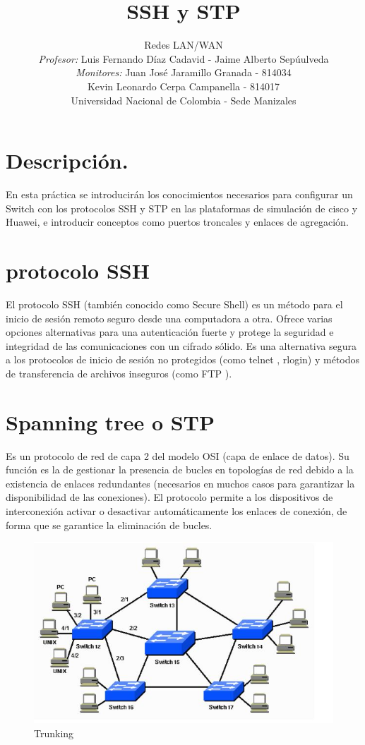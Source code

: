 \documentclass[journal]{IEEEtran}
\title{\textbf{SSH y STP}}
\author{Redes LAN/WAN \\
	\textit{Profesor:} Luis Fernando Díaz Cadavid - Jaime Alberto Sepúulveda\\
	\textit{Monitores:} Juan José Jaramillo Granada - 814034 \\
	Kevin Leonardo Cerpa Campanella - 814017 \\
	Universidad Nacional de Colombia - Sede Manizales}
\date{}
\begin{document}
\maketitle

\section{\textbf{Descripción.}}
En esta práctica se introducirán los conocimientos necesarios para configurar un Switch con los protocolos SSH y STP en las plataformas de simulación de cisco y Huawei, e introducir conceptos como puertos troncales y  enlaces de agregación.

\section{\textbf{protocolo SSH}}
El protocolo SSH (también conocido como Secure Shell) es un método para el inicio de sesión remoto seguro desde una computadora a otra. Ofrece varias opciones alternativas para una autenticación fuerte y protege la seguridad e integridad de las comunicaciones con un cifrado sólido. Es una alternativa segura a los protocolos de inicio de sesión no protegidos (como telnet , rlogin) y métodos de transferencia de archivos inseguros (como FTP ).

\section{\textbf{Spanning tree o STP}}
Es un protocolo de red de capa 2 del modelo OSI (capa de enlace de datos). Su función es la de gestionar la presencia de bucles en topologías de red debido a la existencia de enlaces redundantes (necesarios en muchos casos para garantizar la disponibilidad de las conexiones). El protocolo permite a los dispositivos de interconexión activar o desactivar automáticamente los enlaces de conexión, de forma que se garantice la eliminación de bucles.

\begin{figure}[ht]
	\centering
	\includegraphics[scale=0.5]{2.jpg}
	\caption{Trunking}
\end{figure}
\end{document}
